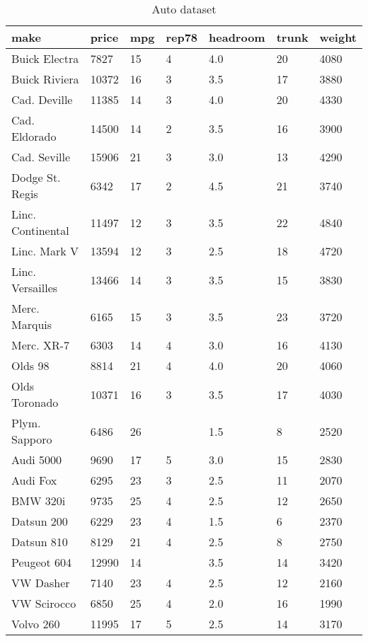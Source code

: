 \documentclass{article}
\begin{document}
\begin{table}[tbp] \centering
\setlength{\tabcolsep}{20pt}

\caption{Auto dataset}
\begin{tabularx}{\linewidth}{@{}lCCCCCC@{}}

\toprule
{make}&{price}&{mpg}&{rep78}&{headroom}&{trunk}&{weight} \tabularnewline
\midrule \addlinespace[\belowrulesep]
Buick Electra&7827&15&4&4.0&20&4080 \tabularnewline
Buick Riviera&10372&16&3&3.5&17&3880 \tabularnewline
Cad. Deville&11385&14&3&4.0&20&4330 \tabularnewline
Cad. Eldorado&14500&14&2&3.5&16&3900 \tabularnewline
Cad. Seville&15906&21&3&3.0&13&4290 \tabularnewline
Dodge St. Regis&6342&17&2&4.5&21&3740 \tabularnewline
Linc. Continental&11497&12&3&3.5&22&4840 \tabularnewline
Linc. Mark V&13594&12&3&2.5&18&4720 \tabularnewline
Linc. Versailles&13466&14&3&3.5&15&3830 \tabularnewline
Merc. Marquis&6165&15&3&3.5&23&3720 \tabularnewline
Merc. XR-7&6303&14&4&3.0&16&4130 \tabularnewline
Olds 98&8814&21&4&4.0&20&4060 \tabularnewline
Olds Toronado&10371&16&3&3.5&17&4030 \tabularnewline
Plym. Sapporo&6486&26&&1.5&8&2520 \tabularnewline
Audi 5000&9690&17&5&3.0&15&2830 \tabularnewline
Audi Fox&6295&23&3&2.5&11&2070 \tabularnewline
BMW 320i&9735&25&4&2.5&12&2650 \tabularnewline
Datsun 200&6229&23&4&1.5&6&2370 \tabularnewline
Datsun 810&8129&21&4&2.5&8&2750 \tabularnewline
Peugeot 604&12990&14&&3.5&14&3420 \tabularnewline
VW Dasher&7140&23&4&2.5&12&2160 \tabularnewline
VW Scirocco&6850&25&4&2.0&16&1990 \tabularnewline
Volvo 260&11995&17&5&2.5&14&3170 \tabularnewline
\bottomrule 

\end{tabularx}
\end{table}
\end{document}
